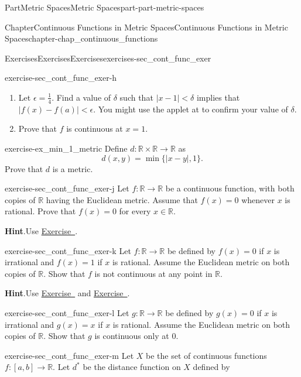 \documentclass[oneside,10pt,]{book}
\newcommand{\blocktitlefont}{\relax}
\newcommand{\xreffont}{\relax}
\numberwithin{equation}{chapter}
\newcommand{\R}{\mathbb{R}}
\newcommand{\lt}{<}
\begin{document}
\begin{partptx}{Part}{Metric Spaces}{}{Metric Spaces}{}{}{part-part-metric-spaces}
\begin{chapterptx}{Chapter}{Continuous Functions in Metric Spaces}{}{Continuous Functions in Metric Spaces}{}{}{chapter-chap_continuous_functions}
\begin{exercises-section}{Exercises}{Exercises}{}{Exercises}{}{}{exercises-sec_cont_func_exer}
\begin{divisionexercise}{8}{}{}{exercise-sec_cont_func_exer-h}
\begin{enumerate}[font=\bfseries,label=(\alph*),ref=\alph*]
\item{}Let \(\epsilon = \frac{1}{4}\). Find a value of \(\delta\) such that \(|x-1| \lt \delta\) implies that \(|f(x)-f(a)| \lt \epsilon\). You might use the applet at to confirm your value of \(\delta\).%
\item{}Prove that \(f\) is continuous at \(x=1\).%
\end{enumerate}%
\end{divisionexercise}%
\begin{divisionexercise}{9}{}{}{exercise-ex_min_1_metric}%
Define \(d: \R \times \R \to \R\) as%
\begin{equation*}
d(x,y) = \min\{|x-y|,1\}\text{.}
\end{equation*}
Prove that \(d\) is a metric.%
\end{divisionexercise}%
\begin{divisionexercise}{10}{}{}{exercise-sec_cont_func_exer-j}%
Let \(f : \R \to \R\) be a continuous function, with both copies of \(\R\) having the Euclidean metric. Assume that \(f(x) = 0\) whenever \(x\) is rational. Prove that \(f(x) = 0\) for every \(x \in \R\).%
\par\smallskip%
\noindent\textbf{\blocktitlefont Hint}.\hypertarget{hint-sec_cont_func_exer-j-b}{}\quad{}Use \hyperlink{exercise-ex_GLB_rational}{Exercise~{\xreffont 7}}.%
\end{divisionexercise}%
\begin{divisionexercise}{11}{}{}{exercise-sec_cont_func_exer-k}%
Let \(f: \R \to \R\) be defined by \(f(x) = 0\) if \(x\) is irrational and \(f(x) = 1\) if \(x\) is rational. Assume the Euclidean metric on both copies of \(\R\). Show that \(f\) is not continuous at any point in \(\R\).%
\par\smallskip%
\noindent\textbf{\blocktitlefont Hint}.\hypertarget{hint-sec_cont_func_exer-k-b}{}\quad{}Use \hyperlink{exercise-ex_GLB_rational}{Exercise~{\xreffont 7}} and \hyperlink{exercise-ex_GLB_irrational}{Exercise~{\xreffont 10}}.%
\end{divisionexercise}%
\begin{divisionexercise}{12}{}{}{exercise-sec_cont_func_exer-l}%
Let \(g: \R \to \R\) be defined by \(g(x) = 0\) if \(x\) is irrational and \(g(x) = x\) if \(x\) is rational. Assume the Euclidean metric on both copies of \(\R\). Show that \(g\) is continuous only at \(0\).%
\end{divisionexercise}%
\begin{divisionexercise}{13}{}{}{exercise-sec_cont_func_exer-m}%
Let \(X\) be the set of continuous functions \(f: [a,b] \to \mathbb{R}\). Let \(d^*\) be the distance function on \(X\) defined by%

\end{divisionexercise}
\end{exercises-section}
\end{chapterptx}
\end{partptx}
\end{document}
